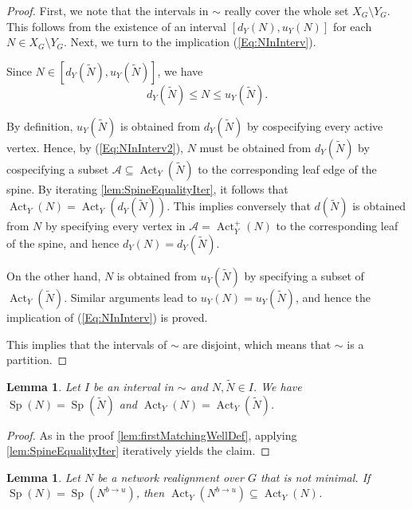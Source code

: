 \documentclass[reqno,dvipsnames]{amsart}
\theoremstyle{plain}
\newtheorem{lemma}[theorem]{Lemma}
\numberwithin{equation}{section}
\theoremstyle{definition}
\DeclareMathOperator{\Act}{Act}
\DeclareMathOperator{\Sp}{Sp}
\begin{document}
\begin{proof}
	First, we note that the intervals in $\sim$ really cover the whole set $X_G\setminus Y_G$. This follows from the existence of an interval $[d_Y(N),u_Y(N)]$ for each $N\in X_G\setminus Y_G$. Next, we turn to the implication (\ref{Eq:NInInterv}).
	
	Since $N\in  [d_Y(\tilde{N}),u_Y(\tilde{N})]$, we have 
	\begin{equation}\label{Eq:NInInterv2}
		d_Y(\tilde{N}) \leq N \leq u_Y(\tilde{N}).
	\end{equation}
	
	By definition, $u_Y(\tilde{N})$ is obtained from $d_Y(\tilde{N})$ by cospecifying every active vertex. Hence, by (\ref{Eq:NInInterv2}), $N$ must be obtained from $d_Y(\tilde{N})$ by cospecifying a subset $\mathcal{A}\subseteq \Act_Y(\tilde{N})$ to the corresponding leaf edge of the spine. By iterating \autoref{lem:SpineEqualityIter}, it follows that $\Act_Y(N)= \Act_Y(d_Y(\tilde{N}))$. This implies conversely that $d(\tilde{N})$ is obtained from $N$ by specifying every vertex in $\mathcal{A} = \Act_Y^+(N)$ to the corresponding leaf of the spine, and hence $d_Y(N)=d_Y(\tilde{N})$.
	
	On the other hand, $N$ is obtained from $u_Y(\tilde{N})$ by specifying a subset of $\Act_Y(\tilde{N})$. Similar arguments lead to $u_Y(N)=u_Y(\tilde{N})$, and hence the implication of (\ref{Eq:NInInterv}) is proved.
	
	This implies that the intervals of $\sim$ are disjoint, which means that $\sim$ is a partition.
\end{proof}

\begin{lemma} \label{lem:SpineEquality}
	Let $I$ be an interval in $\sim$ and $N,\tilde{N}\in I$. We have $\Sp(N) = \Sp(\tilde{N})$ and $\Act_Y(N) = \Act_Y(\tilde{N})$.
\end{lemma}

\begin{proof}
	As in the proof \autoref{lem:firstMatchingWellDef}, applying \autoref{lem:SpineEqualityIter} iteratively yields the claim.
\end{proof} 

\begin{lemma}\label{lem:ActiveDecreasing}
	Let $N$ be a network realignment over $G$ that is not minimal. If $\Sp(N) = \Sp(N^{b\to u})$, then $\Act_Y(N^{b\to u}) \subseteq \Act_Y(N)$.
\end{lemma}
\end{document}
